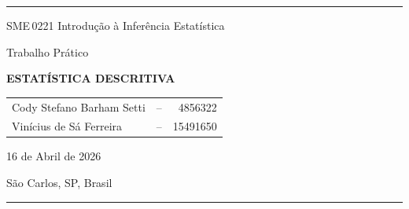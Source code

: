\begin{center}
	\rule{0.95\textwidth}{1.5pt}

	
	{\sffamily SME\,0221 Introdução à Inferência Estatística}

	\vspace*{\baselineskip}

	{\Large\sffamily Trabalho Prático}

	\vspace*{\baselineskip}

	{\sffamily\bfseries\LARGE ESTATÍSTICA DESCRITIVA}
	
	\vspace*{1.5\baselineskip}

	\begin{tabular}{lcr}
		Cody Stefano Barham Setti & -- & 4856322 \\
		Vinícius de Sá Ferreira & -- & 15491650
	\end{tabular}

	\vspace*{1.5\baselineskip}
	
	{\normalsize 16 de Abril de 2026}

	\vspace*{.75\baselineskip}

	{\normalsize São Carlos, SP, Brasil}


	\rule{0.95\textwidth}{1.5pt}
\end{center}

